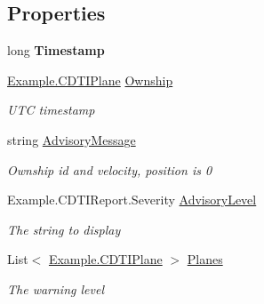\subsection*{Properties}
\begin{DoxyCompactItemize}
\item 
\hypertarget{class_example_1_1_c_d_t_i_report_aa757cb6e78cfd34982eecc6f381c5450}{}long {\bfseries Timestamp}\label{class_example_1_1_c_d_t_i_report_aa757cb6e78cfd34982eecc6f381c5450}

\item 
\hyperlink{class_example_1_1_c_d_t_i_plane}{Example.\+C\+D\+T\+I\+Plane} \hyperlink{class_example_1_1_c_d_t_i_report_ad40efe2d19d10dabc930320ba2835337}{Ownship}
\begin{DoxyCompactList}\small\item\em U\+T\+C timestamp\end{DoxyCompactList}\item 
string \hyperlink{class_example_1_1_c_d_t_i_report_a6859a3fc5d356d9125d589e23a6cc2b9}{Advisory\+Message}
\begin{DoxyCompactList}\small\item\em Ownship id and velocity, position is 0\end{DoxyCompactList}\item 
Example.\+C\+D\+T\+I\+Report.\+Severity \hyperlink{class_example_1_1_c_d_t_i_report_a55ef7e8b3e35eeeb0b273fd3c475ba31}{Advisory\+Level}
\begin{DoxyCompactList}\small\item\em The string to display\end{DoxyCompactList}\item 
List$<$ \hyperlink{class_example_1_1_c_d_t_i_plane}{Example.\+C\+D\+T\+I\+Plane} $>$ \hyperlink{class_example_1_1_c_d_t_i_report_a73959c38addf562d6b64ecb538db006a}{Planes}
\begin{DoxyCompactList}\small\item\em The warning level\end{DoxyCompactList}\end{DoxyCompactItemize}


